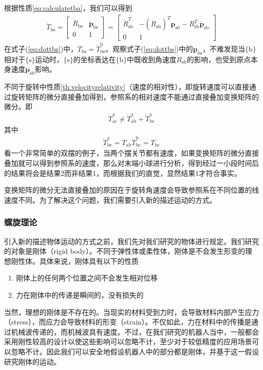 \documentclass[12pt, a4paper, article, UTF8]{ctexart}
\begin{document}
根据性质\ref{eq:calculatetba}，我们可以得到
\begin{align}
\dot{T}_\text{bs} = \begin{bmatrix}
\dot{R}_\text{bs} & \dot{\mathbf{p}}_\text{bs}\\
0 & 1
\end{bmatrix} = 
\begin{bmatrix}
\dot{R}_\text{sb}^T & -(\dot{R}_\text{sb})^T \mathbf{p}_\text{sb} - R_\text{sb}^T \dot{\mathbf{p}}_\text{sb} \\
0 & 1
\end{bmatrix} \label{eq:dottbs}
\end{align}
在式子(\ref{eq:dottbs})中，$\dot{T}_\text{bs} = \dot{T}_\text{bs}^\text{b}$。观察式子(\ref{eq:dottbs})中的$\dot{\mathbf{p}}_\text{bs}$，不难发现当$\{\text{b}\}$相对于$\{\text{s}\}$运动时，$\{\text{s}\}$的坐标表达在$\{\text{b}\}$中既收到角速度$\dot{R}_\text{sb}$的影响，也受到原点本身速度$\dot{\mathbf{p}}_\text{sb}$影响。

不同于旋转中性质\ref{th:velocityrelativity}（速度的相对性），即旋转速度可以直接通过旋转矩阵的微分直接叠加得到，参照系的相对速度不能通过直接叠加变换矩阵的微分。即
\begin{align}
\dot{T}_\text{ac}^\text{a} \neq \dot{T}_\text{ab}^\text{a} + \dot{T}_\text{bc}^\text{a} \label{eq:dottaddwrong}
\end{align}
其中
\begin{align}
\dot{T}_\text{bc}^\text{a} = T_\text{ab} \dot{T}_\text{bc}^\text{b} = T_\text{bc}
\end{align}
看一个非常简单的双摆的例子，当两个摆关节都有速度，如果变换矩阵的微分直接叠加就可以得到参照系的速度，那么对末端小球进行分析，得到经过一小段时间后的结果将会是结果2而非结果1，而根据我们的直觉，显然结果1才符合事实。

变换矩阵的微分无法直接叠加的原因在于旋转角速度会导致参照系在不同位置的线速度不同。为了解决这个问题，我们需要引入新的描述运动的方式。

\subsubsection{螺旋理论}
引入新的描述物体运动的方式之前，我们先对我们研究的物体进行规定。我们研究的对象是刚体（rigid body）。不同于弹性体或柔性体，刚体是不会发生形变的理想刚性体。具体来说，刚体具有以下的性质
\begin{enumerate}
\item 刚体上的任何两个位置之间不会发生相对位移
\item 力在刚体中的传递是瞬间的，没有损失的
\end{enumerate}
当然，理想的刚体是不存在的。当现实的材料受到力时，会导致材料内部产生应力（stress），而应力会导致材料的形变（strain）。不仅如此，力在材料中的传播是通过机械波传递的，而机械波具有速度。不过，在我们研究的机器人当中，一般都会采用刚性较高的设计以使这些影响可以忽略不计，至少对于较低精度的应用场景可以忽略不计。因此我们可以安全地假设机器人中的部分都是刚体，并基于这一假设研究刚体的运动。
\end{document}
